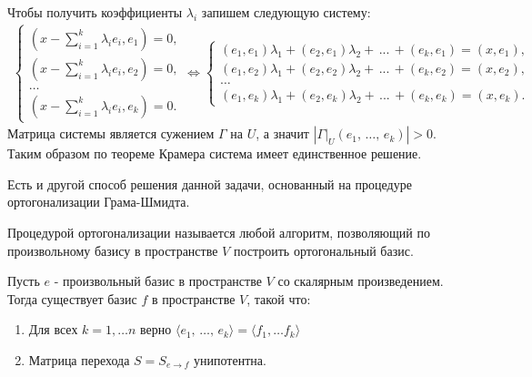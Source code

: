 \begin{algorithm}
\begin{enumerate}
        Чтобы получить коэффициенты $\lambda_i$ запишем следующую систему:
        \begin{eqnarray*}
            \begin{cases*}
                (x - \displaystyle\sum_{i=1}^{k} \lambda_i e_i, e_1) = 0,
                \\
                (x - \displaystyle\sum_{i=1}^{k} \lambda_i e_i, e_2) = 0,
                \\
                \dots
                \\
                (x - \displaystyle\sum_{i=1}^{k} \lambda_i e_i, e_k) = 0.
            \end{cases*} \Leftrightarrow \begin{cases*}
                (e_1, e_1) \lambda_1 + (e_2, e_1) \lambda_2 + \, ... \, + (e_k, e_1) = (x, e_1),
                \\
                (e_1, e_2) \lambda_1 + (e_2, e_2) \lambda_2 + \, ... \, + (e_k, e_2) = (x, e_2),
                \\
                \dots
                \\
                (e_1, e_k) \lambda_1 + (e_2, e_k) \lambda_2 + \, ... \, + (e_k, e_k) = (x, e_k).
            \end{cases*}
        \end{eqnarray*}
        Матрица системы является сужением $\Gamma$ на $U$, а значит $|\Gamma \vert_{U} (e_1, \, \dots, \, e_k)| > 0$.
        Таким образом по теореме Крамера система имеет единственное решение.
    \end{enumerate}
\end{algorithm}

\begin{note}
    Есть и другой способ решения данной задачи, основанный на процедуре ортогонализации Грама-Шмидта.
\end{note}

\begin{definition}
    Процедурой ортогонализации называется любой алгоритм, позволяющий по произвольному базису 
    в пространстве $V$ построить ортогональный базис.
\end{definition}

\begin{theorem}
    Пусть $e$ - произвольный базис в пространстве $V$ со скалярным произведением. Тогда существует 
    базис $f$ в пространстве $V$, такой что:
    \begin{enumerate}
        \item Для всех $k = 1, \dots n$ верно $\langle e_1, \, \dots, \, e_k \rangle = \langle f_1, \dots f_k \rangle$
        \item Матрица перехода $S = S_{e \to f}$ унипотентна.
    \end{enumerate}
\end{theorem}


